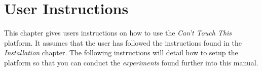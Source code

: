 \documentclass{standalone}
\begin{document}
  \section{User Instructions}
  This chapter gives users instructions on how to use the \textit{Can't Touch
    This} platform. It assumes that the user has followed the instructions found
  in the \textit{Installation} chapter. The following instructions will detail
  how to setup the platform so that you can conduct the \textit{experiments}
  found further into this manual.


\end{document}
